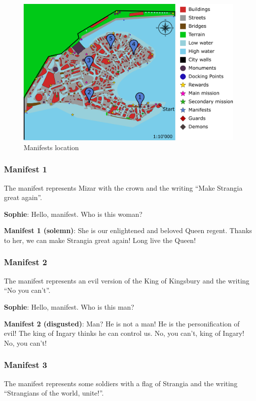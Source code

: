 \begin{figure}[H]
  \centering
  \includegraphics[width=\textwidth]{../Images/Maps/dynamiaSecondaryMissions_Manifests}
  \caption{Manifests location}
\end{figure}

\subsubsection*{Manifest 1}
The manifest represents Mizar with the crown and the writing \enquote{Make Strangia great again}.

\textbf{Sophie}: Hello, manifest. Who is this woman?

\textbf{Manifest 1 (solemn)}: She is our enlightened and beloved Queen regent. Thanks to her, we can make Strangia great again! Long live the Queen!

\subsubsection*{Manifest 2}
The manifest represents an evil version of the King of Kingsbury and the writing \enquote{No you can't}.

\textbf{Sophie}: Hello, manifest. Who is this man?

\textbf{Manifest 2 (disgusted)}: Man? He is not a man! He is the personification of evil! The king of Ingary thinks he can control us. No, you can't, king of Ingary! No, you can't!

\subsubsection*{Manifest 3}
The manifest represents some soldiers with a flag of Strangia and the writing \enquote{Strangians of the world, unite!}.

